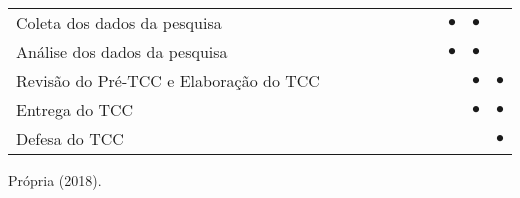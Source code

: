 \begin{table}[!ht]
{{\begin{tabular}{lcccccccccc}
\rowcolor[HTML]{EFEFEF} 
Coleta dos dados da pesquisa                                                     &              &              &              &              & \textbf{}    & \textbf{}    & \textbf{}    & \textbf{$\bullet$}   & \textbf{$\bullet$}   & \textbf{}    \\
Análise dos dados da pesquisa                                                    &              &              &              &              & \textbf{}    & \textbf{}    & \textbf{}    & \textbf{$\bullet$}   & \textbf{$\bullet$}   & \textbf{}    \\
\rowcolor[HTML]{EFEFEF} 
Revisão do Pré-TCC e Elaboração do TCC                                           &              &              &              &              & \textbf{}    & \textbf{}    & \textbf{}    & \textbf{}    & \textbf{$\bullet$}   & \textbf{$\bullet$}   \\
Entrega do TCC                                                                   &              &              &              &              & \textbf{}    & \textbf{}    & \textbf{}    & \textbf{}    & \textbf{$\bullet$}   & \textbf{$\bullet$}   \\
\rowcolor[HTML]{EFEFEF} 
Defesa do TCC & & & & & \textbf{} & \textbf{} & \textbf{} & \textbf{} & \textbf{} & \textbf{$\bullet$}\\
\hline

\end{tabular}
}
}
\fonte Própria (2018).
		\label{tab:cronograma}
\end{table}